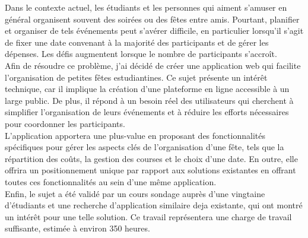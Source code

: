 Dans le contexte actuel, les étudiants et les personnes qui aiment s'amuser en général organisent souvent des soirées ou des fêtes entre amis.
Pourtant, planifier et organiser de tels événements peut s'avérer difficile, en particulier lorsqu'il s'agit de fixer une date convenant à la majorité des participants et de gérer les dépenses.
Les défis augmentent lorsque le nombre de participants s'accroît.\\

Afin de résoudre ce problème, j'ai décidé de créer une application web qui facilite l'organisation de petites fêtes estudiantines.
Ce sujet présente un intérêt technique, car il implique la création d'une plateforme en ligne accessible à un large public.
De plus, il répond à un besoin réel des utilisateurs qui cherchent à simplifier l'organisation de leurs événements et à réduire les efforts nécessaires pour coordonner les participants.\\

L'application apportera une plus-value en proposant des fonctionnalités spécifiques pour gérer les aspects clés de l'organisation d'une fête, tels que la répartition des coûts,
la gestion des courses et le choix d'une date.
En outre, elle offrira un positionnement unique par rapport aux solutions existantes en offrant toutes ces fonctionnalités au sein d'une même application.\\

Enfin, le sujet a été validé par un cours sondage auprès d'une vingtaine d'étudiants et une recherche d'application similaire deja existante, qui ont montré un intérêt pour une telle solution.
Ce travail représentera une charge de travail suffisante, estimée à environ 350 heures.